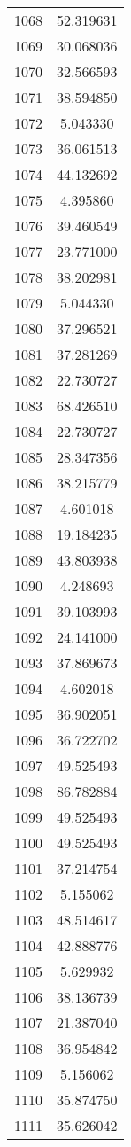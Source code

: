 \documentclass[12pt]{article}
\begin{document}
\begin{longtable}{@{}cc@{}}
1068 & 52.319631 \\
1069 & 30.068036 \\
1070 & 32.566593 \\
1071 & 38.594850 \\
1072 & 5.043330 \\
1073 & 36.061513 \\
1074 & 44.132692 \\
1075 & 4.395860 \\
1076 & 39.460549 \\
1077 & 23.771000 \\
1078 & 38.202981 \\
1079 & 5.044330 \\
1080 & 37.296521 \\
1081 & 37.281269 \\
1082 & 22.730727 \\
1083 & 68.426510 \\
1084 & 22.730727 \\
1085 & 28.347356 \\
1086 & 38.215779 \\
1087 & 4.601018 \\
1088 & 19.184235 \\
1089 & 43.803938 \\
1090 & 4.248693 \\
1091 & 39.103993 \\
1092 & 24.141000 \\
1093 & 37.869673 \\
1094 & 4.602018 \\
1095 & 36.902051 \\
1096 & 36.722702 \\
1097 & 49.525493 \\
1098 & 86.782884 \\
1099 & 49.525493 \\
1100 & 49.525493 \\
1101 & 37.214754 \\
1102 & 5.155062 \\
1103 & 48.514617 \\
1104 & 42.888776 \\
1105 & 5.629932 \\
1106 & 38.136739 \\
1107 & 21.387040 \\
1108 & 36.954842 \\
1109 & 5.156062 \\
1110 & 35.874750 \\
1111 & 35.626042 \\

\end{longtable}
\end{document}
